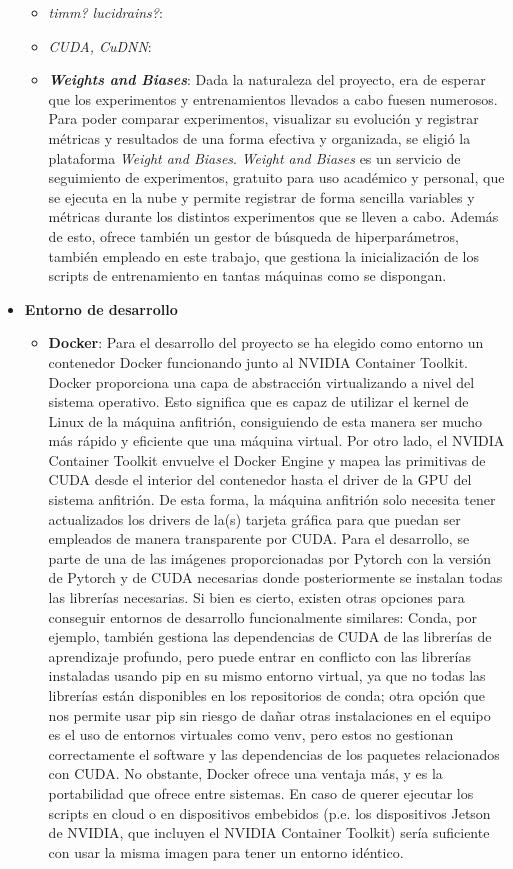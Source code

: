 \begin{itemize}
\begin{itemize}
		\item \textit{timm? lucidrains?}:
		\item \textit{CUDA, CuDNN}:
		\item \textbf{\textit{Weights and Biases}}: Dada la naturaleza del proyecto, era de esperar que los experimentos y entrenamientos llevados a cabo fuesen numerosos. Para poder comparar experimentos, visualizar su evolución y registrar métricas y resultados de una forma efectiva y organizada, se eligió la plataforma \textit{Weight and Biases}. \textit{Weight and Biases} es un servicio de seguimiento de experimentos, gratuito para uso académico y personal, que se ejecuta en la nube y permite registrar de forma sencilla variables y métricas durante los distintos experimentos que se lleven a cabo. Además de esto, ofrece también un gestor de búsqueda de hiperparámetros, también empleado en este trabajo, que gestiona la inicialización de los scripts de entrenamiento en tantas máquinas como se dispongan. 
	\end{itemize}
	\item \textbf{Entorno de desarrollo}
	\begin{itemize}
		\item \textbf{Docker}: Para el desarrollo del proyecto se ha elegido como entorno un contenedor Docker funcionando junto al NVIDIA Container Toolkit. Docker proporciona una capa de abstracción virtualizando a nivel del sistema operativo. Esto significa que es capaz de utilizar el kernel de Linux de la máquina anfitrión, consiguiendo de esta manera ser mucho más rápido y eficiente que una máquina virtual. Por otro lado, el NVIDIA Container Toolkit envuelve el Docker Engine y mapea las primitivas de CUDA desde el interior del contenedor hasta el driver de la GPU del sistema anfitrión. De esta forma, la máquina anfitrión solo necesita tener actualizados los drivers de la(s) tarjeta gráfica para que puedan ser empleados de manera transparente por CUDA. Para el desarrollo, se parte de una de las imágenes proporcionadas por Pytorch con la versión de Pytorch y de CUDA necesarias donde posteriormente se instalan todas las librerías necesarias. Si bien es cierto, existen otras opciones para conseguir entornos de desarrollo funcionalmente similares: Conda, por ejemplo, también gestiona las dependencias de CUDA de las librerías de aprendizaje profundo, pero puede entrar en conflicto con las librerías instaladas usando pip en su mismo entorno virtual, ya que no todas las librerías están disponibles en los repositorios de conda; otra opción que nos permite usar pip sin riesgo de dañar otras instalaciones en el equipo es el uso de entornos virtuales como venv, pero estos no gestionan correctamente el software y las dependencias de los paquetes relacionados con CUDA. No obstante, Docker ofrece una ventaja más, y es la portabilidad que ofrece entre sistemas. En caso de querer ejecutar los scripts en cloud o en dispositivos embebidos (p.e. los dispositivos Jetson de NVIDIA, que incluyen el NVIDIA Container Toolkit) sería suficiente con usar la misma imagen para tener un entorno idéntico.

\end{itemize}
\end{itemize}
